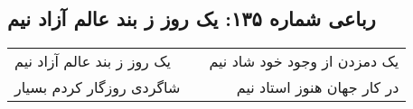 \begin{center}
\section*{رباعی شماره ۱۳۵: یک روز ز بند عالم آزاد نیم}
\label{sec:sh135}
\begin{longtable}{l p{0.5cm} r}
یک روز ز بند عالم آزاد نیم
&&
یک دمزدن از وجود خود شاد نیم
\\
شاگردی روزگار کردم بسیار
&&
در کار جهان هنوز استاد نیم
\\
\end{longtable}
\end{center}
